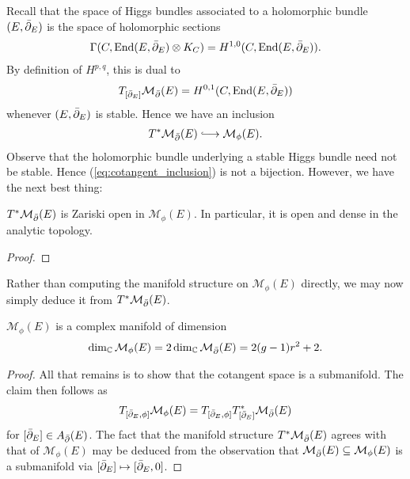 \documentclass[12pt]{ociamthesis}  %
\begin{document}
Recall that the space of Higgs bundles associated to a holomorphic
bundle $(E,{\bar{\partial}}_E)$ is the space of holomorphic sections
\begin{align*}
  \Gamma(C,\operatorname{End}(E,{\bar{\partial}}_E) \otimes K_C) = H^{1,0}(C,\operatorname{End}(E,{\bar{\partial}}_E)).
\end{align*}
By definition of $H^{p,q}$, this is dual to
\begin{align*}
  T_{[{\bar{\partial}}_E]}\mathcal M_{\bar{\partial}}(E) = H^{0,1}(C,\operatorname{End}(E,{\bar{\partial}}_E))
\end{align*}
whenever $(E,{\bar{\partial}}_E)$ is stable. Hence we have an inclusion
\begin{align}\label{eq:cotangent_inclusion}
  T^*\mathcal M_\dol(E) \longinc\mathcal M_\phi(E).
\end{align}
Observe that the holomorphic bundle underlying a stable Higgs bundle need
not be stable. Hence (\ref{eq:cotangent_inclusion}) is not a bijection.
However, we have the next best thing:

\begin{theorem}
  $T^*\mathcal M_{\bar{\partial}}(E)$ is Zariski open in $\mathcal M_\phi(E)$.
  In particular, it is open and dense in the analytic topology.
  \begin{proof}
    \missingproof
  \end{proof}
\end{theorem}

Rather than computing the manifold structure on $\mathcal M_\phi(E)$
directly, we may now simply deduce it from $T^*\mathcal M_{\bar{\partial}}(E)$.

\begin{corollary}
  $\mathcal M_\phi(E)$ is a complex manifold of dimension
  \begin{align*}
    \dim_{\mathbb C}\mathcal M_{\phi}(E)
    =2\dim_{\mathbb C}\mathcal M_{\bar{\partial}}(E)
    =2(g-1)r^2 + 2.
  \end{align*}
  \begin{proof}
    All that remains is to show that the cotangent space is a submanifold.
    The claim then follows as
    \begin{align*}
     T_{[{\bar{\partial}}_E,\phi]}\mathcal M_\phi(E) = T_{[{\bar{\partial}}_E,\phi]} T^*_{[{\bar{\partial}}_E]}\mathcal M_{\bar{\partial}}(E)
    \end{align*}
    for $[{\bar{\partial}}_E]\in A_{\bar{\partial}}(E)$. The fact that the manifold
    structure $T^*\mathcal M_{\bar{\partial}}(E)$ agrees with that of $\mathcal M_{\phi}(E)$
    may be deduced from the observation that
    $\mathcal M_{\bar{\partial}}(E) \subseteq \mathcal M_\phi(E)$ is a submanifold
    via $[{\bar{\partial}}_E] \mapsto [{\bar{\partial}}_E,0]$.
  \end{proof}
\end{corollary}
\end{document}
